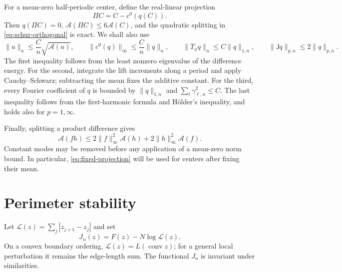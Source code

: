 \documentclass[11pt,reqno]{amsart}
\numberwithin{equation}{section}
\theoremstyle{definition}
\theoremstyle{remark}
\newcommand{\A}{\mathcal A}
\newcommand{\norm}[1]{\lVert #1\rVert}
\DeclareMathOperator{\conv}{conv}
\begin{document}
For a mean-zero half-periodic center, define the real-linear projection
\begin{equation}\label{eq:fixed-projection}
 \Pi C=C-c^0(q(C)).
\end{equation}
Then $q(\Pi C)=0$, $\A(\Pi C)\le6\A(C)$, and the quadratic splitting in
\eqref{eq:schur-orthogonal} is exact. We shall also use
\begin{equation}\label{eq:additional-norms}
 \norm u_n\le\frac Cn\sqrt{\A(u)},\qquad
 \norm{c^0(q)}_\infty\le\frac Cn\norm q_n,\qquad
 \norm{T_nq}_n\le C\norm q_{1,n},\qquad
 \norm{\mathsf Jq}_{p,n}\le2\norm q_{p,n}.
\end{equation}
The first inequality follows from the least nonzero eigenvalue of the difference energy. For the second, integrate the lift increments along a period and apply Cauchy--Schwarz; subtracting the mean fixes the additive constant. For the third, every Fourier coefficient of $q$ is bounded by $\norm q_{1,n}$ and $\sum_\ell\gamma_{\ell,n}^2\le C$. The last inequality follows from the first-harmonic formula and H\"older's inequality, and holds also for $p=1,\infty$.

Finally, splitting a product difference gives
\begin{equation}\label{eq:product-energy}
 \A(fh)\le2\norm f_\infty^2\A(h)+2\norm h_\infty^2\A(f).
\end{equation}
Constant modes may be removed before any application of a mean-zero norm bound. In particular, \eqref{eq:fixed-projection} will be used for centers after fixing their mean.


\section{Perimeter stability}\label{sec:perimeter}
Let $\mathcal L(z)=\sum_j|z_{j+1}-z_j|$ and set
\[
 J_n(z)=F(z)-N\log\mathcal L(z).
\]
On a convex boundary ordering, $\mathcal L(z)=L(\conv z)$; for a general local perturbation it remains the edge-length sum. The functional $J_n$ is invariant under similarities.
\end{document}
